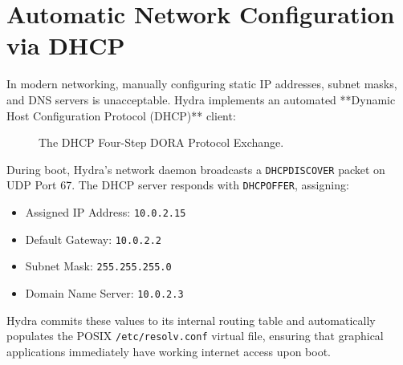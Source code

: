 \section{Automatic Network Configuration via DHCP}
\label{sec:dhcp_deep}

In modern networking, manually configuring static IP addresses, subnet masks, and DNS servers is unacceptable. Hydra implements an automated **Dynamic Host Configuration Protocol (DHCP)** client:

\begin{figure}[htbp]
\centering
{}
\caption{The DHCP Four-Step DORA Protocol Exchange.}
\label{fig:dhcp_dora}
\end{figure}

During boot, Hydra's network daemon broadcasts a \texttt{DHCPDISCOVER} packet on UDP Port 67. The DHCP server responds with \texttt{DHCPOFFER}, assigning:
\begin{itemize}
    \item Assigned IP Address: \texttt{10.0.2.15}
    \item Default Gateway: \texttt{10.0.2.2}
    \item Subnet Mask: \texttt{255.255.255.0}
    \item Domain Name Server: \texttt{10.0.2.3}
\end{itemize}
Hydra commits these values to its internal routing table and automatically populates the POSIX \texttt{/etc/resolv.conf} virtual file, ensuring that graphical applications immediately have working internet access upon boot.


